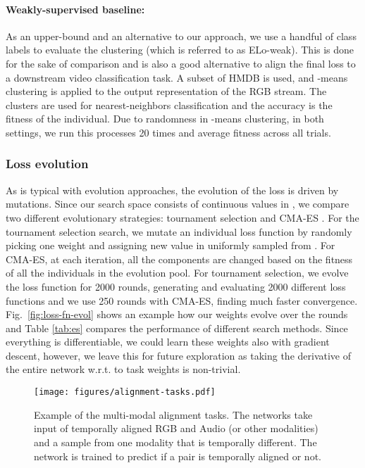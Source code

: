 \documentclass[10pt,twocolumn,letterpaper]{article}
\begin{document}
\paragraph{Weakly-supervised baseline:} As an upper-bound and an alternative to our approach, we use a handful of class labels to evaluate the clustering (which is referred to as ELo-weak). This is done for the sake of comparison and is also a good alternative to align the final loss to a downstream video classification task.
A subset of HMDB is used, and -means clustering is applied to the output representation of the RGB stream. The clusters are used for nearest-neighbors classification and the accuracy is the fitness of the individual.  Due to randomness in -means clustering, in both settings, we run this processes 20 times and average fitness across all trials.







\subsubsection{Loss evolution}

As is typical with evolution approaches, the evolution of the loss is driven by mutations.
Since our search space consists of continuous values in , we compare two different evolutionary strategies: tournament selection \cite{goldberg91acomparative} and CMA-ES \cite{cmaes}. For the tournament selection search, we mutate an individual loss function by randomly picking one weight and assigning new value in uniformly sampled from . For CMA-ES, at each iteration, all the components are changed based on the fitness of all the individuals in the evolution pool. For tournament selection, we evolve the loss function for 2000 rounds, generating and evaluating 2000 different loss functions and we use 250 rounds with CMA-ES, finding much faster convergence. Fig.~\ref{fig:loss-fn-evol} shows an example how our weights evolve over the rounds and Table \ref{tab:es} compares the performance of different search methods.
Since everything is differentiable, we could learn these weights also with gradient descent, however, we leave this for future exploration as taking the derivative of the entire network w.r.t. to task weights is non-trivial.


\begin{figure}
    \centering
    \texttt{[image: figures/alignment-tasks.pdf]}
    \caption{Example of the multi-modal alignment tasks. The networks take input of temporally aligned RGB and Audio (or other modalities) and a sample from one modality that is temporally different. The network is trained to predict if a pair is temporally aligned or not.}
    \label{fig:align-tasks}
\end{figure}
\end{document}
